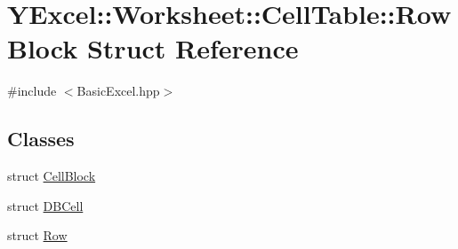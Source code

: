 \hypertarget{struct_y_excel_1_1_worksheet_1_1_cell_table_1_1_row_block}{}\section{Y\+Excel\+:\+:Worksheet\+:\+:Cell\+Table\+:\+:Row\+Block Struct Reference}
\label{struct_y_excel_1_1_worksheet_1_1_cell_table_1_1_row_block}


{\ttfamily \#include $<$Basic\+Excel.\+hpp$>$}

\subsection*{Classes}
\begin{DoxyCompactItemize}
\item 
struct \hyperlink{struct_y_excel_1_1_worksheet_1_1_cell_table_1_1_row_block_1_1_cell_block}{Cell\+Block}
\item 
struct \hyperlink{struct_y_excel_1_1_worksheet_1_1_cell_table_1_1_row_block_1_1_d_b_cell}{D\+B\+Cell}
\item 
struct \hyperlink{struct_y_excel_1_1_worksheet_1_1_cell_table_1_1_row_block_1_1_row}{Row}
\end{DoxyCompactItemize}
